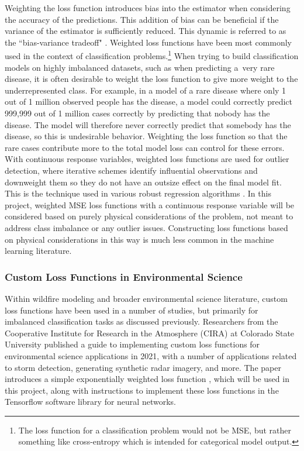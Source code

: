 \documentclass[11pt]{article}%
\begin{document}
Weighting the loss function introduces bias into the estimator when considering the accuracy of the predictions. This addition of bias can be beneficial if the variance of the estimator is sufficiently reduced. This dynamic is referred to as the ``bias-variance tradeoff" \citep[p.\ 37]{Hastie-2010-ESL}. Weighted loss functions have been most commonly used in the context of classification problems.\footnote{The loss function for a classification problem would not be MSE, but rather something like cross-entropy which is intended for categorical model output.} When trying to build classification models on highly imbalanced datasets, such as when predicting a~very rare disease, it is often desirable to weight the loss function to give more weight to the underrepresented class. For example, in a model of a rare disease where only 1 out of 1 million observed people has the disease, a model could correctly predict 999,999 out of 1 million cases correctly by predicting that nobody has the disease. The model will therefore never correctly predict that somebody has the disease, so this is undesirable behavior. Weighting the loss function so that the rare cases contribute more to the total model loss can control for these errors. With continuous response variables, weighted loss functions are used for outlier detection, where iterative schemes identify influential observations and downweight them so they do not have an outsize effect on the final model fit. This is the technique used in various robust regression algorithms \citep{OLeary-1990-RRC}. In this project, weighted MSE loss functions with a continuous response variable will be considered based on purely physical considerations of the problem, not meant to address class imbalance or any outlier issues. Constructing loss functions based on physical considerations in this way is much less common in the machine learning literature.

\subsubsection{Custom Loss Functions in Environmental Science}
\hfill

Within wildfire modeling and broader environmental science literature, custom loss functions have been used in a number of studies, but primarily for imbalanced classification tasks as discussed previously. Researchers from the Cooperative Institute for Research in the Atmosphere (CIRA) at Colorado State University published a guide to implementing custom loss functions for environmental science applications in 2021, with a number of applications related to storm detection, generating synthetic radar imagery, and more. The paper introduces a simple exponentially weighted loss function \citep[p.\ 7]{Ebert-2021-GCL}, which will be used in this project, along with instructions to implement these loss functions in the Tensorflow software library for neural networks.
\end{document}
